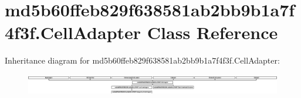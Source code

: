 \hypertarget{classmd5b60ffeb829f638581ab2bb9b1a7f4f3f_1_1CellAdapter}{}\section{md5b60ffeb829f638581ab2bb9b1a7f4f3f.\+Cell\+Adapter Class Reference}
\label{classmd5b60ffeb829f638581ab2bb9b1a7f4f3f_1_1CellAdapter}
Inheritance diagram for md5b60ffeb829f638581ab2bb9b1a7f4f3f.\+Cell\+Adapter\+:\begin{figure}[H]
\begin{center}
\leavevmode
\includegraphics[height=0.933333cm]{classmd5b60ffeb829f638581ab2bb9b1a7f4f3f_1_1CellAdapter}
\end{center}
\end{figure}
